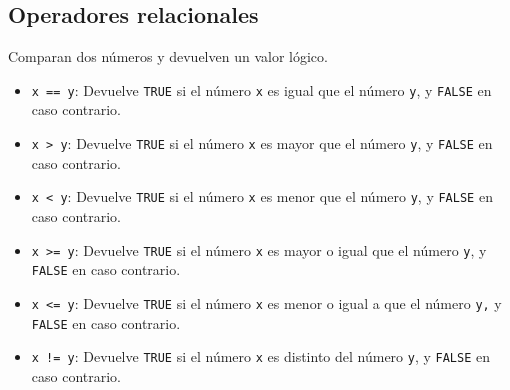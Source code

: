 \documentclass[
  spanish,
  a4paper,
]{scrreport}
\providecommand{\tightlist}{%
  \setlength{\itemsep}{0pt}\setlength{\parskip}{0pt}}
\theoremstyle{definition}
\theoremstyle{definition}
\theoremstyle{remark}
\begin{document}
\subsection{Operadores relacionales}\label{operadores-relacionales}

Comparan dos números y devuelven un valor lógico.

\begin{itemize}
\tightlist
\item
  \texttt{x\ ==\ y}: Devuelve \texttt{TRUE} si el número \texttt{x} es
  igual que el número \texttt{y}, y \texttt{FALSE} en caso contrario.
\item
  \texttt{x\ \textgreater{}\ y}: Devuelve \texttt{TRUE} si el número
  \texttt{x} es mayor que el número \texttt{y}, y \texttt{FALSE} en caso
  contrario.
\item
  \texttt{x\ \textless{}\ y}: Devuelve \texttt{TRUE} si el número
  \texttt{x} es menor que el número \texttt{y}, y \texttt{FALSE} en caso
  contrario.
\item
  \texttt{x\ \textgreater{}=\ y}: Devuelve \texttt{TRUE} si el número
  \texttt{x} es mayor o igual que el número \texttt{y}, y \texttt{FALSE}
  en caso contrario.
\item
  \texttt{x\ \textless{}=\ y}: Devuelve \texttt{TRUE} si el número
  \texttt{x} es menor o igual a que el número \texttt{y,} y
  \texttt{FALSE} en caso contrario.
\item
  \texttt{x\ !=\ y}: Devuelve \texttt{TRUE} si el número \texttt{x} es
  distinto del número \texttt{y}, y \texttt{FALSE} en caso contrario.
\end{itemize}
\end{document}
